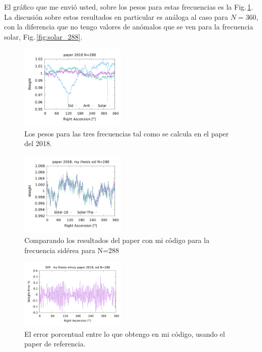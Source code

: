 El gráfico que me envió usted, sobre los pesos para estas frecuencias es la Fig.\,\ref{fig:all_288_paper}. La discusión sobre estos resultados en particular es análoga al caso para $N=360$, con la diferencia que no tengo valores de anómalos que se ven para la frecuencia solar, Fig.\,\ref{fig:solar_288}.
\begin{figure}[H]
	\centering
	\includegraphics[width=0.45\textwidth]{solar_anti_sid_paper2018_in_288.png}
	\caption{Los pesos para las tres frecuencias tal como se calcula en el paper del 2018.}
	\label{fig:all_288_paper}
\end{figure}



\begin{figure}[H]
	\centering
	\includegraphics[width=0.45\textwidth]{sidereal_my_and_paper_in_288.png}
	\caption{Comparando los resultados del paper con mi código para la frecuencia sidérea para N=288}
	\label{fig:sidereal_288}
\end{figure}


\begin{figure}[H]
	\centering
	\includegraphics[width=0.45\textwidth]{sidereal_my_and_paper_in_288_error.png}
	\caption{El error porcentual entre lo que obtengo en mi código, usando el paper de referencia.}
	\label{fig:error_288_sidereal}
\end{figure}


